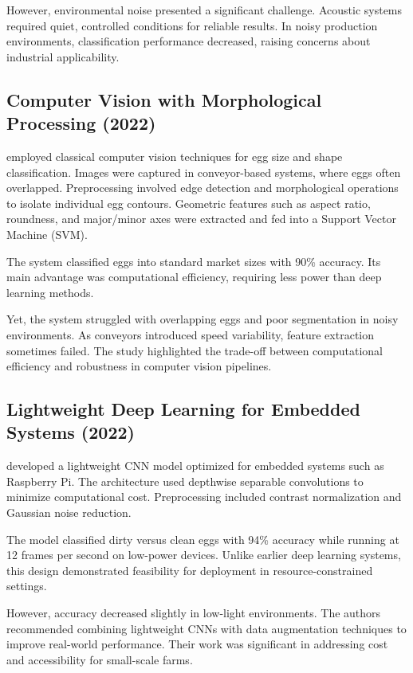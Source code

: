 \documentclass[conference]{IEEEtran}
\begin{document}
	However, environmental noise presented a significant challenge. Acoustic systems required quiet, controlled conditions for reliable results. In noisy production environments, classification performance decreased, raising concerns about industrial applicability.
	
	\subsection{Computer Vision with Morphological Processing (2022)}
	\cite{singh2022vision} employed classical computer vision techniques for egg size and shape classification. Images were captured in conveyor-based systems, where eggs often overlapped. Preprocessing involved edge detection and morphological operations to isolate individual egg contours. Geometric features such as aspect ratio, roundness, and major/minor axes were extracted and fed into a Support Vector Machine (SVM).  
	
	The system classified eggs into standard market sizes with 90\% accuracy. Its main advantage was computational efficiency, requiring less power than deep learning methods.  
	
	Yet, the system struggled with overlapping eggs and poor segmentation in noisy environments. As conveyors introduced speed variability, feature extraction sometimes failed. The study highlighted the trade-off between computational efficiency and robustness in computer vision pipelines.
	
	\subsection{Lightweight Deep Learning for Embedded Systems (2022)}
	\cite{chen2022lightweight} developed a lightweight CNN model optimized for embedded systems such as Raspberry Pi. The architecture used depthwise separable convolutions to minimize computational cost. Preprocessing included contrast normalization and Gaussian noise reduction.  
	
	The model classified dirty versus clean eggs with 94\% accuracy while running at 12 frames per second on low-power devices. Unlike earlier deep learning systems, this design demonstrated feasibility for deployment in resource-constrained settings.  
	
	However, accuracy decreased slightly in low-light environments. The authors recommended combining lightweight CNNs with data augmentation techniques to improve real-world performance. Their work was significant in addressing cost and accessibility for small-scale farms.
	
\end{document}

